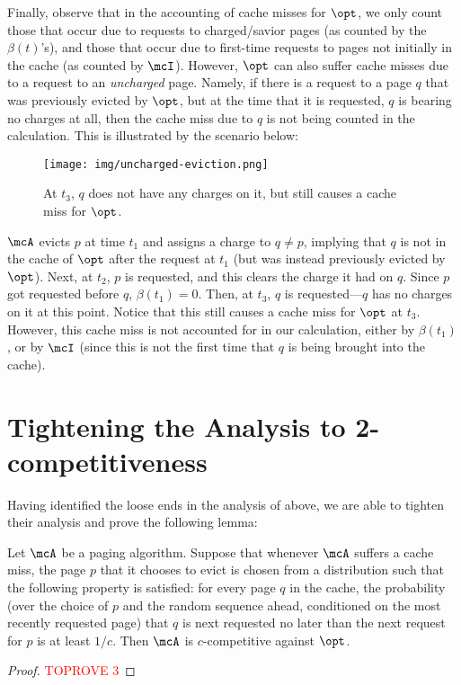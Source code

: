 \documentclass[11pt]{article}
\begin{document}
Finally, observe that in the accounting of cache misses for $\opt$, we only count those that occur due to requests to charged/savior pages (as counted by the $\beta(t)$'s), and those that occur due to first-time requests to pages not initially in the cache (as counted by $\mcI$). However, $\opt$ can also suffer cache misses due to a request to an \textit{uncharged} page. Namely, if there is a request to a page $q$ that was previously evicted by $\opt$, but at the time that it is requested, $q$ is bearing no charges at all, then the cache miss due to $q$ is not being counted in the calculation. This is illustrated by the scenario below: 
\begin{figure}[H]
    \centering
    \texttt{[image: img/uncharged-eviction.png]}
    \caption{At $t_3$, $q$ does not have any charges on it, but still causes a cache miss for $\opt$.}
    \label{fig:uncharged-eviction}
\end{figure}
$\mcA$ evicts $p$ at time $t_1$ and assigns a charge to $q \neq p$, implying that $q$ is not in the cache of $\opt$ after the request at $t_1$ (but was instead previously evicted by $\opt$). Next, at $t_2$, $p$ is requested, and this clears the charge it had on $q$. Since $p$ got requested before $q$, $\beta(t_1)=0$. Then, at $t_3$, $q$ is requested---$q$ has no charges on it at this point. Notice that this still causes a cache miss for $\opt$ at $t_3$. However, this cache miss is not accounted for in our calculation, either by $\beta(t_1)$, or by $\mcI$ (since this is not the first time that $q$ is being brought into the cache).
 \section{Tightening the Analysis to 2-competitiveness}
\label{sec:tight-analysis}
Having identified the loose ends in the analysis of \cite{lund1999paging} above, we are able to tighten their analysis and prove the following lemma:
\begin{lemma}
    \label{lem:tight-analysis}
    Let $\mcA$ be a paging algorithm. Suppose that whenever $\mcA$ suffers a cache miss, the page $p$ that it chooses to evict is chosen from a distribution such that the following property is satisfied: for every page $q$ in the cache, the probability (over the choice of $p$ and the random sequence ahead, conditioned on the most recently requested page) that $q$ is next requested no later than the next request for $p$ is at least $1/c$. Then $\mcA$ is $c$-competitive against $\opt$.
\end{lemma}
\begin{proof}\textcolor{red}{TOPROVE 3}\end{proof}
\end{document}
